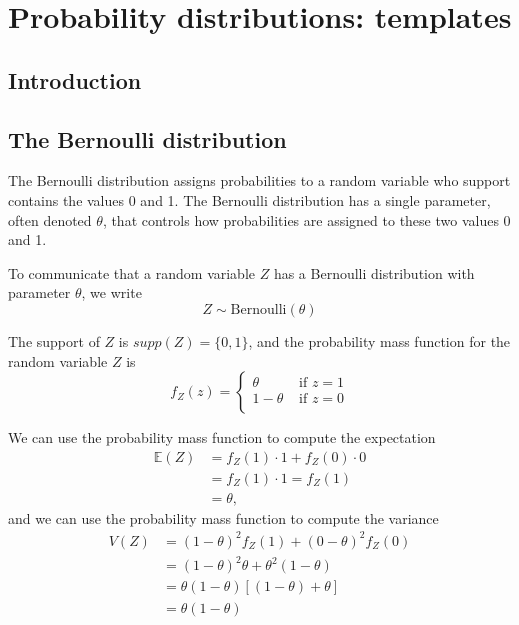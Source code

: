 \chapter{Probability distributions: templates}
\hspace{1mm}

\section{Introduction}\label{intro}


\section{The Bernoulli distribution}

The Bernoulli distribution assigns probabilities to a random variable who support contains the values 0 and 1. The Bernoulli distribution has a single parameter, often denoted $\theta$, that controls how probabilities are assigned to these two values 0 and 1.

To communicate that a random variable $Z$ has a Bernoulli distribution with parameter $\theta$, we write 
\begin{equation}
    Z \sim \text{Bernoulli}(\theta)    
\end{equation}

The support of $Z$ is $supp(Z) = \{0,1\}$, and the probability mass function for the random variable $Z$ is 
\begin{equation}
    f_{Z}(z) = \begin{cases}
                   \theta & \text{ if } z=1\\
                   1- \theta & \text{ if } z=0\\
               \end{cases}
\end{equation}

We can use the probability mass function to compute the expectation
\begin{align}
    \mathbb{E}(Z) &= f_{Z}(1) \cdot 1 + f_{Z}(0) \cdot 0\\
                  &= f_{Z}(1) \cdot 1 = f_{Z}(1)\\
                  &= \theta,
\end{align}
and we can use the probability mass function to compute the variance
\begin{align}
    V(Z) &= (1 - \theta)^{2} f_{Z}(1)+ (0-\theta)^{2} f_{Z}(0) \\
         &= (1 - \theta)^{2} \theta + \theta^{2} (1-\theta)\\
         &= \theta(1-\theta) \left[ (1-\theta) + \theta  \right]\\
         &= \theta(1-\theta)
\end{align}

